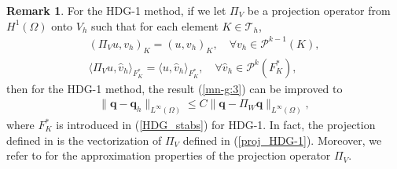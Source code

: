\documentclass[1996/10/24]{amsart}
\theoremstyle{definition}
\newtheorem{remark}[theorem]{Remark}
\numberwithin{equation}{section}
\begin{document}
\begin{remark}
For the HDG-1 method, if we let $\Pi_V$ be a projection operator from $H^1(\Omega)$ onto $V_h$ such that for each element $K\in\mathcal{T}_h$,
\begin{subequations}\label{proj_HDG-1}
\begin{align}
(\Pi_Vu,v_h)_K=(u,v_h)_K,\quad \forall v_h\in\mathcal{P}^{k-1}(K),\\
\langle\Pi_Vu,\widehat{v}_h\rangle_{F_K^{\ast}}=\langle u,\widehat{v}_h\rangle_{F_K^{\ast}},\quad \forall\widehat{v}_h\in\mathcal{P}^k(F_K^{\ast}),
\end{align}
\end{subequations}
then for the HDG-1 method, the result (\ref{mn-g:3}) can be improved to
\begin{align}
\|{\bm q}-{\bm q}_h\|_{L^{\infty}(\Omega)}\leq C\|{\bm q}-\Pi_W{\bm q}\|_{L^{\infty}(\Omega)},\label{mn-g:4}
\end{align}
where $F_{K}^{\ast}$ is introduced in (\ref{HDG_stabs}) for HDG-1.
In fact, the projection defined in \cite[($4.8$)]{cfq2018} is the vectorization of $\Pi_{V}$ defined in (\ref{proj_HDG-1}).
Moreover, we refer to \cite[Proposition~$4.3$]{cfq2018} for the approximation properties of the projection operator $\Pi_{V}$.


\end{remark}
\end{document}
